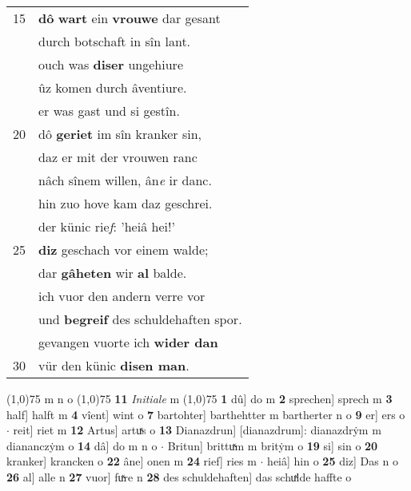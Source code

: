 \documentclass[8pt,a4paper,notitlepage]{article}
\begin{document}
\begin{table}[ht]
\begin{minipage}[t]{0.5\linewidth}
\begin{tabular}{rl}
15 & \textbf{dô} \textbf{wart} ein \textbf{vrouwe} dar gesant\\ 
 & durch botschaft in sîn lant.\\ 
 & ouch was \textbf{diser} ungehiure\\ 
 & ûz komen durch âventiure.\\ 
 & er was gast und si gestîn.\\ 
20 & dô \textbf{geriet} im sîn kranker sin,\\ 
 & daz er mit der vrouwen ranc\\ 
 & nâch sînem willen, ân\textit{e} ir danc.\\ 
 & hin zuo hove kam daz geschrei.\\ 
 & der künic rie\textit{f}: 'heiâ hei!'\\ 
25 & \textbf{diz} geschach vor einem walde;\\ 
 & dar \textbf{gâheten} wir \textbf{al} balde.\\ 
 & ich vuor den andern verre vor\\ 
 & und \textbf{begreif} des schuldehaften spor.\\ 
 & gevangen vuorte ich \textbf{wider dan}\\ 
30 & vür den künic \textbf{disen man}.\\ 
\end{tabular}
\scriptsize
\line(1,0){75} \newline
m n o \newline
\line(1,0){75} \newline
\textbf{11} \textit{Initiale} m  \newline
\line(1,0){75} \newline
\textbf{1} dû] do m \textbf{2} sprechen] sprech m \textbf{3} half] halft m \textbf{4} vîent] wint o \textbf{7} bartohter] barthehtter m bartherter n o \textbf{9} er] ers o  $\cdot$ reit] riet m \textbf{12} Artus] artuͯs o \textbf{13} Dianazdrun] [dianazdrum]: dianazdrẏm m diananczẏm o \textbf{14} dâ] do m n o  $\cdot$ Britun] brittuͯm m britẏm o \textbf{19} si] sin o \textbf{20} kranker] krancken o \textbf{22} âne] onen m \textbf{24} rief] ries m  $\cdot$ heiâ] hin o \textbf{25} diz] Das n o \textbf{26} al] alle n \textbf{27} vuor] fuͯre n \textbf{28} des schuldehaften] das schuͯlde haffte o \newline
\end{minipage}
\end{table}
\newpage
\end{document}
